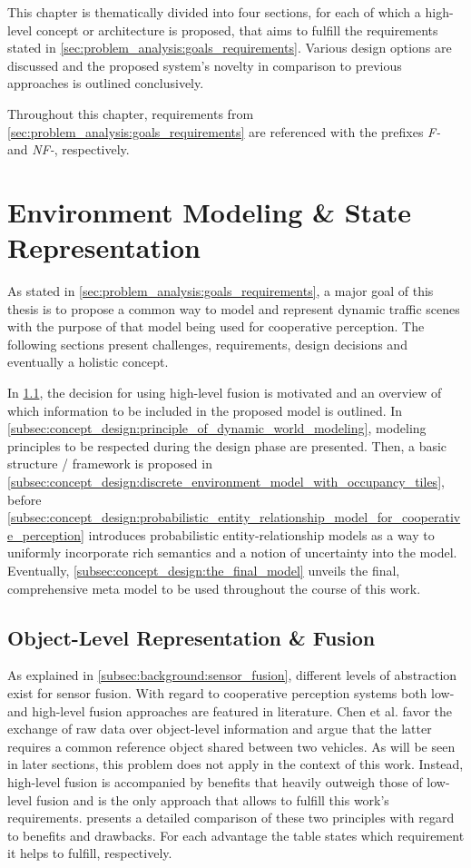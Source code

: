 This chapter is thematically divided into four sections, for each of which a high-level concept or architecture is proposed, that aims to fulfill the requirements stated in \cref{sec:problem_analysis:goals_requirements}. Various design options are discussed and the proposed system's novelty in comparison to previous approaches is outlined conclusively.

Throughout this chapter, requirements from \cref{sec:problem_analysis:goals_requirements} are referenced with the prefixes \textit{F-} and \textit{NF-}, respectively.

\section{Environment Modeling \& State Representation}
\label{sec:concept_design:environment_modeling_state_representation}
As stated in \cref{sec:problem_analysis:goals_requirements}, a major goal of this thesis is to propose a common way to model and represent dynamic traffic scenes with the purpose of that model being used for cooperative perception. The following sections present challenges, requirements, design decisions and eventually a holistic concept.

In \cref{subsec:concept_design:object_level_representation_fusion}, the decision for using high-level fusion is motivated and an overview of which information to be included in the proposed model is outlined. In \cref{subsec:concept_design:principle_of_dynamic_world_modeling}, modeling principles to be respected during the design phase are presented. Then, a basic structure / framework is proposed in \cref{subsec:concept_design:discrete_environment_model_with_occupancy_tiles}, before \cref{subsec:concept_design:probabilistic_entity_relationship_model_for_cooperative_perception} introduces probabilistic entity-relationship models as a way to uniformly incorporate rich semantics and a notion of uncertainty into the model. Eventually, \cref{subsec:concept_design:the_final_model} unveils the final, comprehensive meta model to be used throughout the course of this work.

\subsection{Object-Level Representation \& Fusion}
\label{subsec:concept_design:object_level_representation_fusion}
As explained in \cref{subsec:background:sensor_fusion}, different levels of abstraction exist for sensor fusion. With regard to cooperative perception systems both low- and high-level fusion approaches are featured in literature. Chen et al. \cite{Chen2019} favor the exchange of raw data over object-level information and argue that the latter requires a common reference object shared between two vehicles. As will be seen in later sections, this problem does not apply in the context of this work. Instead, high-level fusion is accompanied by benefits that heavily outweigh those of low-level fusion and is the only approach that allows to fulfill this work's requirements.  presents a detailed comparison of these two principles with regard to benefits and drawbacks. For each advantage the table states which requirement it helps to fulfill, respectively. 

